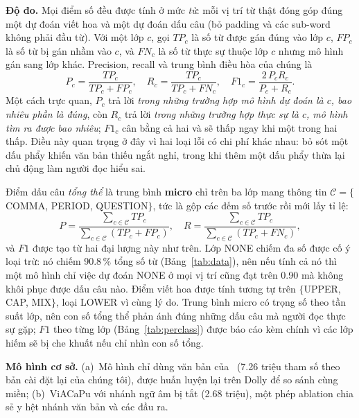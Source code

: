 \documentclass[conference,onecolumn]{IEEEtran}
\begin{document}
\textbf{Độ đo.} Mọi điểm số đều được tính ở mức \emph{từ}: mỗi vị trí từ thật đóng
góp đúng một dự đoán viết hoa và một dự đoán dấu câu (bỏ padding và các sub-word
không phải đầu từ). Với một lớp $c$, gọi $TP_c$ là số từ được gán đúng vào lớp $c$,
$FP_c$ là số từ bị gán nhầm vào $c$, và $FN_c$ là số từ thực sự thuộc lớp $c$ nhưng
mô hình gán sang lớp khác. Precision, recall và trung bình điều hòa của chúng là
\begin{equation}
P_c = \frac{TP_c}{TP_c + FP_c},\quad
R_c = \frac{TP_c}{TP_c + FN_c},\quad
F1_c = \frac{2\,P_c R_c}{P_c + R_c}.
\end{equation}
Một cách trực quan, $P_c$ trả lời \emph{trong những trường hợp mô hình dự đoán là
$c$, bao nhiêu phần là đúng}, còn $R_c$ trả lời \emph{trong những trường hợp thực
sự là $c$, mô hình tìm ra được bao nhiêu}; $F1_c$ cân bằng cả hai và sẽ thấp ngay
khi một trong hai thấp. Điều này quan trọng ở đây vì hai loại lỗi có chi phí khác
nhau: bỏ sót một dấu phẩy khiến văn bản thiếu ngắt nghỉ, trong khi thêm một dấu
phẩy thừa lại chủ động làm người đọc hiểu sai.

Điểm dấu câu \emph{tổng thể} là trung bình \textbf{micro} chỉ trên ba lớp mang
thông tin $\mathcal{C}=\{$COMMA, PERIOD, QUESTION$\}$, tức là gộp các đếm số trước
rồi mới lấy tỉ lệ:
\begin{equation}
P = \frac{\sum_{c \in \mathcal{C}} TP_c}{\sum_{c \in \mathcal{C}} (TP_c + FP_c)},
\quad
R = \frac{\sum_{c \in \mathcal{C}} TP_c}{\sum_{c \in \mathcal{C}} (TP_c + FN_c)},
\end{equation}
và $F1$ được tạo từ hai đại lượng này như trên. Lớp NONE chiếm đa số được cố ý loại
trừ: nó chiếm 90.8\,\% tổng số từ (Bảng~\ref{tab:data}), nên nếu tính cả nó thì một
mô hình chỉ việc dự đoán NONE ở mọi vị trí cũng đạt trên 0.90 mà không khôi phục
được dấu câu nào. Điểm viết hoa được tính tương tự trên $\{$UPPER, CAP, MIX$\}$,
loại LOWER vì cùng lý do. Trung bình micro có trọng số theo tần suất lớp, nên con
số tổng thể phản ánh đúng những dấu câu mà người đọc thực sự gặp; $F1$ theo từng
lớp (Bảng~\ref{tab:perclass}) được báo cáo kèm chính vì các lớp hiếm sẽ bị che
khuất nếu chỉ nhìn con số tổng.

\textbf{Mô hình cơ sở.} (a)~Mô hình chỉ dùng văn bản của~\cite{you2024lightweight}
(7.26 triệu tham số theo bản cài đặt lại của chúng tôi), được huấn luyện lại trên
Dolly để so sánh cùng miền;
(b)~ViACaPu với nhánh ngữ âm bị tắt (2.68 triệu), một phép ablation chia sẻ y hệt
nhánh văn bản và các đầu ra.
\end{document}
